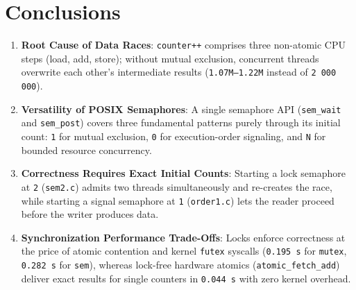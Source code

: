 \documentclass[12pt,a4paper]{article}
\begin{document}
\section{Conclusions}

\begin{enumerate}
    \item \textbf{Root Cause of Data Races}: \texttt{counter++} comprises three non-atomic CPU steps (load, add, store); without mutual exclusion, concurrent threads overwrite each other's intermediate results (\texttt{1.07M--1.22M} instead of \texttt{2\,000\,000}).
    \item \textbf{Versatility of POSIX Semaphores}: A single semaphore API (\texttt{sem\_wait} and \texttt{sem\_post}) covers three fundamental patterns purely through its initial count: \texttt{1} for mutual exclusion, \texttt{0} for execution-order signaling, and \texttt{N} for bounded resource concurrency.
    \item \textbf{Correctness Requires Exact Initial Counts}: Starting a lock semaphore at \texttt{2} (\texttt{sem2.c}) admits two threads simultaneously and re-creates the race, while starting a signal semaphore at \texttt{1} (\texttt{order1.c}) lets the reader proceed before the writer produces data.
    \item \textbf{Synchronization Performance Trade-Offs}: Locks enforce correctness at the price of atomic contention and kernel \texttt{futex} syscalls (\texttt{0.195\,s} for \texttt{mutex}, \texttt{0.282\,s} for \texttt{sem}), whereas lock-free hardware atomics (\texttt{atomic\_fetch\_add}) deliver exact results for single counters in \texttt{0.044\,s} with zero kernel overhead.
\end{enumerate}
\end{document}
